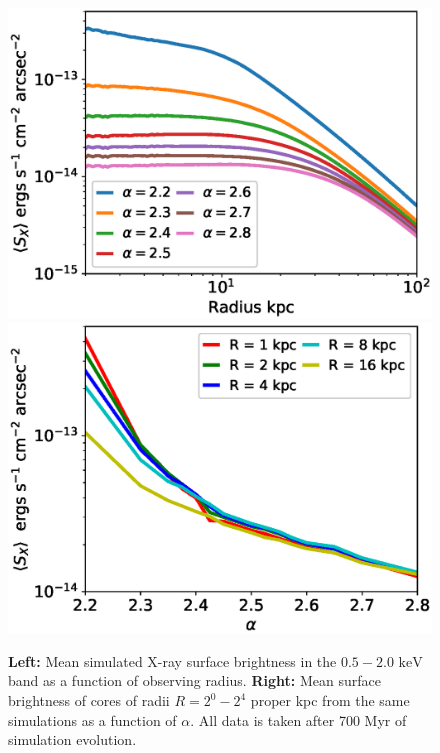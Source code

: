 \documentclass[iop,apjl, twocolappendix]{emulateapj}   %
\begin{document}
\begin{figure}
	\begin{center}
		\includegraphics[width=0.49\linewidth]{figures/surfaceBrightnessVradius.eps}
		\includegraphics[width=0.49\linewidth]{figures/surfaceBrightnessValpha.eps}
	\end{center}
	\caption{
		\textbf{Left:} Mean simulated X-ray surface brightness in the $0.5
	-2.0 \text{ keV}$ band as a function of observing radius. \textbf{Right:}
	Mean surface brightness of cores of radii $R = 2^0 - 2^4$ proper kpc from
	the same simulations as a function of $\alpha$. All data is taken after 700
	Myr of simulation evolution.
}
\end{figure}
\end{document}

